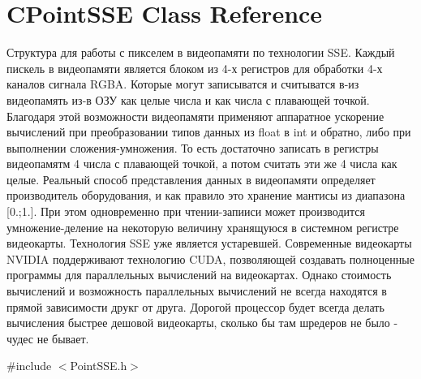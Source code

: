 \hypertarget{class_c_point_s_s_e}{\section{C\+Point\+S\+S\+E Class Reference}
\label{class_c_point_s_s_e}
}


Структура для работы с пикселем в видеопамяти по технологии S\+S\+E. Каждый пискель в видеопамяти является блоком из 4-\/х регистров для обработки 4-\/х каналов сигнала R\+G\+B\+A. Которые могут записыватся и считыватся в-\/из видеопамять из-\/в ОЗУ как целые числа и как числа с плавающей точкой. Благодаря этой возможности видеопамяти применяют аппаратное ускорение вычислений при преобразовании типов данных из float в int и обратно, либо при выполнении сложения-\/умножения. То есть достаточно записать в регистры видеопамятм 4 числа с плавающей точкой, а потом считать эти же 4 числа как целые. Реальный способ представления данных в видеопамяти определяет производитель оборудования, и как правило это хранение мантисы из диапазона \mbox{[}0.;1.\mbox{]}. При этом одновременно при чтении-\/запииси может производится умножение-\/деление на некоторую величину хранящуюся в системном регистре видеокарты. Технология S\+S\+E уже является устаревшей. Современные видеокарты N\+V\+I\+D\+I\+A поддерживают технологию C\+U\+D\+A, позволяющей создавать полноценные программы для параллельных вычислений на видеокартах. Однако стоимость вычислений и возможность параллельных вычислений не всегда находятся в прямой зависимости друкг от друга. Дорогой процессор будет всегда делать вычисления быстрее дешовой видеокарты, сколько бы там шредеров не было -\/ чудес не бывает.  




{\ttfamily \#include $<$Point\+S\+S\+E.\+h$>$}

